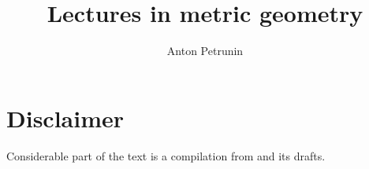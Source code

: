 \documentclass[twoside]{book}
\begin{document}
 
\title{Lectures in metric geometry}
\author{Anton Petrunin}
\date{}
\maketitle



\section*{Disclaimer}

Considerable part of the text is a compilation from \cite{alexander-kapovitch-petrunin-2019, alexander-kapovitch-petrunin-2025, petrunin-yashinski, petrunin-2009, petrunin-zamorabarrera} and its drafts.

\thispagestyle{empty}
\tableofcontents
\thispagestyle{empty}







%
\appendix

{
\printbibliography[heading=bibintoc]
\fussy
}
\end{document}
